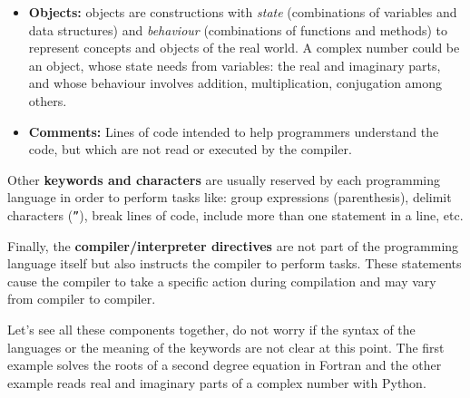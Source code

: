 \begin{itemize}[noitemsep]
    \item \textbf{Objects:} objects are constructions with 
    \textit{state} (combinations of variables and data structures) and 
    \textit{behaviour} (combinations of functions and methods) 
    to represent concepts and objects of the real world. 
    A complex number could be an object, 
    whose state needs from variables: the real and imaginary parts, and 
    whose behaviour involves addition, multiplication, conjugation among others. 
    
    \item \textbf{Comments:} Lines of code intended to help programmers understand the code, 
    but which are not read or executed by the compiler.
\end{itemize}
\vspace{-0.5cm}
Other \textbf{keywords and characters} are usually reserved by each programming language 
in order to perform tasks like: 
group expressions (parenthesis), 
delimit characters (\texttt{''}), 
break lines of code, 
include more than one statement in a line, etc.

Finally, the \textbf{compiler/interpreter directives} are not part of the programming language itself 
but also instructs the compiler to perform tasks. 
These statements cause the compiler to take a specific action during compilation and 
may vary from compiler to compiler.
 
 
Let's see all these components together, 
do not worry if the syntax of the languages or 
the meaning of the keywords are not clear at this point. 
The first example solves the roots of a second degree equation in Fortran and 
the other example reads real and imaginary parts of a complex number with Python.


